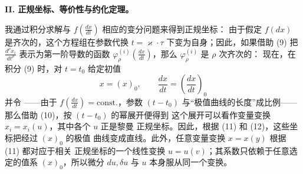 \begin{center}
\textbf{II. 正规坐标、等价性与约化定理。}
\end{center}

我通过积分求解与
\(f\!\left(\frac{dx}{dt}\right)\) 相应的变分问题来得到正规坐标：
由于假定 \(f(dx)\) 是齐次的，这个方程组在参数代换
\(t=\varkappa\cdot\tau\) 下变为自身；因此，如果借助 (9) 把
\(\frac{d^\rho x_i}{dt^\rho}\) 表示为第一阶导数的函数
\(\varphi_\rho^{(i)}\!\left(\frac{dx}{dt}\right)\)，那么
\(\varphi_\rho^{(i)}\) 是 \(\rho\) 次齐次的：
现在，在积分 (9) 时，对 \(t=t_0\) 给定初值
\[
x=(x)_0,\qquad \frac{dx}{dt}=\left(\frac{dx}{dt}\right)_0
\]
并令
——由于 \(f\!\left(\frac{dx}{dt}\right)=\mathrm{const.}\)，参数
\((t-t_0)\) 与“极值曲线的长度”成比例——那么借助 (10)，按
\((t-t_0)\) 的幂展开便得到
这个展开可以看作变量变换 \(x_i=x_i(u)\)，其中各个 \(u\) 正是黎曼
正规坐标。因此，根据 (11) 和 (12)，这些坐标把经过 \((x)_0\) 的极值
曲线变成直线。此外，任意变量变换 \(x=x(y)\) 根据 (11) 都对应于相关
正规坐标的一个线性变换 \(u=u(v)\)；其系数只依赖于任意选定的值系
\((x)_0\)，所以微分 \(du,\delta u\) 与 \(u\) 本身服从同一个变换。

